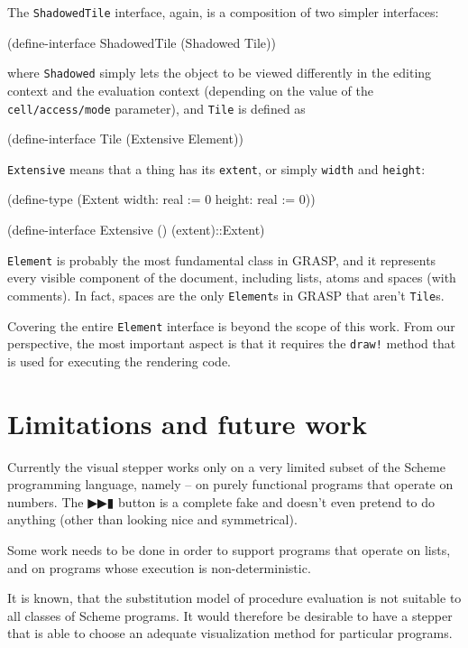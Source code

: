 \documentclass[acmsmall]{acmart}
\newenvironment{Snippet}{\Verbatim[samepage=true]}{\endVerbatim}
\begin{document}
The \texttt{ShadowedTile} interface, again, is a composition
of two simpler interfaces:

\begin{Snippet}
(define-interface ShadowedTile (Shadowed Tile))
\end{Snippet}

where \texttt{Shadowed} simply lets the object to be viewed
differently in the editing context and the evaluation context
(depending on the value of the \texttt{cell\-/access\-/mode}
parameter), and \texttt{Tile} is defined as

\begin{Snippet}
(define-interface Tile (Extensive Element))
\end{Snippet}

\texttt{Extensive} means that a thing has its \texttt{extent},
or simply \texttt{width} and \texttt{height}:

\begin{Snippet}
(define-type (Extent width: real := 0
                     height: real := 0))
  
(define-interface Extensive ()
  (extent)::Extent)
\end{Snippet}

\texttt{Element} is probably the most fundamental class in GRASP, and
it represents every visible component of the document, including
lists, atoms and spaces (with comments). In fact, spaces are the only
\texttt{Element}s in GRASP that aren't \texttt{Tile}s.

Covering the entire \texttt{Element} interface is beyond the scope of
this work. From our perspective, the most important aspect is that it
requires the \texttt{draw!} method that is used for executing the
rendering code.

\section{Limitations and future work}

Currently the visual stepper works only on a very limited subset of
the Scheme programming language, namely -- on purely functional
programs that operate on numbers. The ▶▶▮ button is a complete fake
and doesn't even pretend to do anything (other than looking nice and
symmetrical).

Some work needs to be done in order to support programs that operate
on lists, and on programs whose execution is non-deterministic.

It is known, that the substitution model of procedure evaluation is
not suitable to all classes of Scheme programs. It would therefore be
desirable to have a stepper that is able to choose an adequate
visualization method for particular programs.
\end{document}
